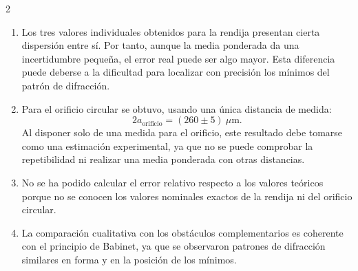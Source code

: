 \documentclass[12pt,a4paper]{article}
\begin{document}
\begin{multicols}{2}
\begin{enumerate}
  \item Los tres valores individuales obtenidos para la rendija presentan cierta dispersión entre sí. Por tanto, aunque la media ponderada da una incertidumbre pequeña, el error real puede ser algo mayor. Esta diferencia puede deberse a la dificultad para localizar con precisión los mínimos del patrón de difracción.

  \item Para el orificio circular se obtuvo, usando una única distancia de medida:
  \[
    2a_{\text{orificio}} = (260 \pm 5)\ \mu\text{m}.
  \]
  Al disponer solo de una medida para el orificio, este resultado debe tomarse como una estimación experimental, ya que no se puede comprobar la repetibilidad ni realizar una media ponderada con otras distancias.

  \item No se ha podido calcular el error relativo respecto a los valores teóricos porque no se conocen los valores nominales exactos de la rendija ni del orificio circular.

  \item La comparación cualitativa con los obstáculos complementarios es coherente con el principio de Babinet, ya que se observaron patrones de difracción similares en forma y en la posición de los mínimos.
\end{enumerate}

\end{multicols}

\printbibliography
\end{document}

